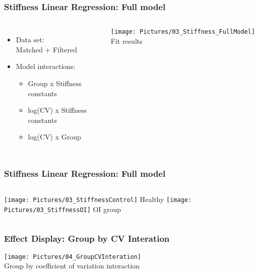 \documentclass[xcolor=table]{beamer}
\begin{document}
\begin{frame}
	\frametitle{Stiffness Linear Regression: Full model}
	\begin{columns}[c]
		\begin{itemize}[label=$\bullet$]
			\item Data set:\\
			Matched + Filtered
			\item Model interactions:\\
			\begin{itemize}
				\item Group x Stiffness constants
				\item log(CV) x Stiffness constants
				\item log(CV) x Group
			\end{itemize}
		\end{itemize}
		\centering
		\vfill
		\texttt{[image: Pictures/03\_Stiffness\_FullModel]}
		Fit results
		\vfill
	\end{columns}
\end{frame}


\begin{frame}
	\frametitle{Stiffness Linear Regression: Full model}
	\begin{columns}[c]
		\centering
		\vfill
		\texttt{[image: Pictures/03\_StiffnessControl]}
		Healthy
		\vfill
		\centering
		\vfill
		\texttt{[image: Pictures/03\_StiffnessOI]}
		OI group
		\vfill
	\end{columns}
\end{frame}


\begin{frame}
	\frametitle{Effect Display: Group by CV Interation}
	\centering
	\vfill
	\texttt{[image: Pictures/04\_GroupCVInteration]}\\
	Group by coefficient of variation interaction
	\vfill
\end{frame}
\end{document}
